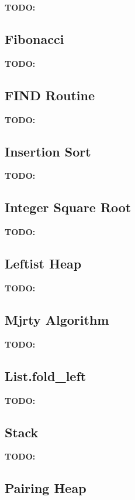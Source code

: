 \documentclass{llncs}
\newcommand{\todo}[1]{\textbf{TODO:}#1}
\begin{document}
\todo

\subsection{Fibonacci}
\label{sec:fibonacci}

\todo

\subsection{FIND Routine}
\label{sec:find-routine}

\todo

\subsection{Insertion Sort}
\label{sec:insertion-sort}

\todo

\subsection{Integer Square Root}
\label{sec:integer-square-root}

\todo

\subsection{Leftist Heap}
\label{sec:leftist-heap}

\todo

\subsection{Mjrty Algorithm}
\label{sec:mjrty-algorithm}

\todo

\subsection{\ocaml List.fold\_left}
\label{sec:ocaml-list.fold_left}

\todo

\subsection{\ocaml Stack}
\label{sec:ocaml-stack}

\todo

\subsection{Pairing Heap}
\label{sec:pairing-heap}
\end{document}
